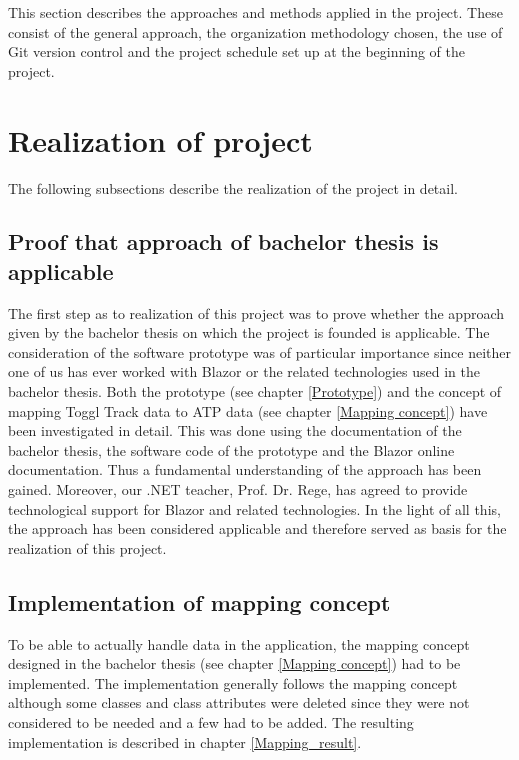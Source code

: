 
This section describes the approaches and methods applied in the project. These consist of the general approach, the organization methodology chosen, the use of Git version control and the project schedule set up at the beginning of the project.

\section{Realization of project}
The following subsections describe the realization of the project in detail.

\subsection{Proof that approach of bachelor thesis is applicable}
The first step as to realization of this project was to prove whether the approach given by the bachelor thesis on which the project is founded is applicable. The consideration of the software prototype was of particular importance since neither one of us has ever worked with Blazor or the related technologies used in the bachelor thesis. Both the prototype (see chapter \ref{Prototype}) and the concept of mapping Toggl Track data to ATP data (see chapter \ref{Mapping concept}) have been investigated in detail. This was done using the documentation of the bachelor thesis, the software code of the prototype and the Blazor online documentation. Thus a fundamental understanding of the approach has been gained. Moreover, our .NET teacher, Prof. Dr. Rege, has agreed to provide technological support for Blazor and related technologies. In the light of all this, the approach has been considered applicable and therefore served as basis for the realization of this project.

\subsection{Implementation of mapping concept}
To be able to actually handle data in the application, the mapping concept designed in the bachelor thesis (see chapter \ref{Mapping concept}) had to be implemented. The implementation generally follows the mapping concept although some classes and class attributes were deleted since they were not considered to be needed and a few had to be added. The resulting implementation is described in chapter \ref{Mapping_result}.

